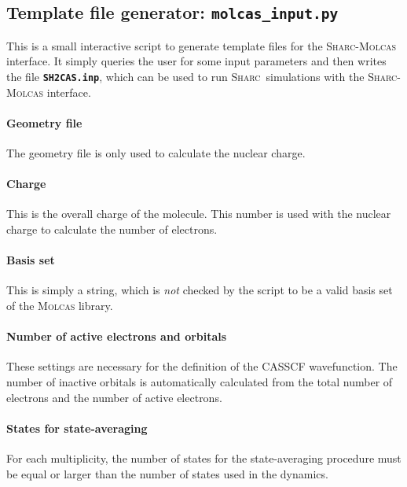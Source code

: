 \documentclass[a4paper,11pt,DIV=15,openany,twoside=false]{scrbook}
\newcommand{\sharc}{\textsc{Sharc}}
\newcommand{\ttt}[1]{\textbf{\texttt{#1}}}
\begin{document}
\subsection{Template file generator: \ttt{molcas\_input.py}}\label{sec:molcas_input.py}

This is a small interactive script to generate template files for the \sharc-\textsc{Molcas} interface. It simply queries the user for some input parameters and then writes the file \ttt{SH2CAS.inp}, which can be used to run \sharc\ simulations with the \sharc-\textsc{Molcas} interface.

\paragraph{Geometry file}

The geometry file is only used to calculate the nuclear charge.

\paragraph{Charge}

This is the overall charge of the molecule. This number is used with the nuclear charge to calculate the number of electrons.

\paragraph{Basis set}

This is simply a string, which is \textit{not} checked by the script to be a valid basis set of the \textsc{Molcas} library.

\paragraph{Number of active electrons and orbitals}

These settings are necessary for the definition of the CASSCF wavefunction. The number of inactive orbitals is automatically calculated from the total number of electrons and the number of active electrons.

\paragraph{States for state-averaging}

For each multiplicity, the number of states for the state-averaging procedure must be equal or larger than the number of states used in the dynamics.
\end{document}
